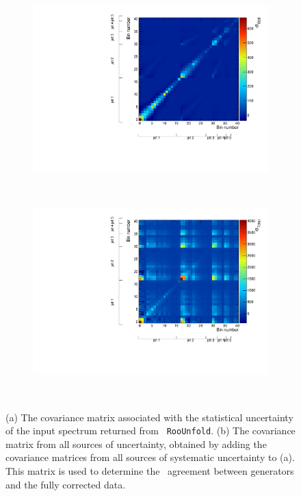 \begin{figure}
\begin{subfigure}[]{0.45\textwidth}
\includegraphics[width=\textwidth]{fig/Cov/Stat.pdf}
\end{subfigure}
~
\begin{subfigure}[]{0.45\textwidth}
\includegraphics[width=\textwidth]{fig/Cov/Total.pdf}
\end{subfigure}
~
\caption{(a) The covariance matrix associated with the statistical uncertainty of the input spectrum returned from \texttt{ RooUnfold}. (b) The covariance matrix from all sources of uncertainty, obtained by adding the covariance matrices from all sources of systematic uncertainty to (a). This matrix is used to determine the \chisq\ agreement between generators and the fully corrected data.}
\label{fig:cov}
\end{figure}



